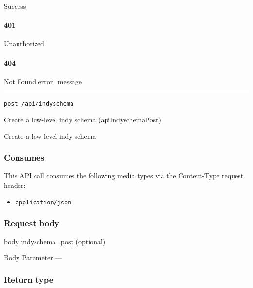 Success

\hypertarget{section-240}{%
\paragraph{401}\label{section-240}}

Unauthorized \protect\hyperlink{}{}

\hypertarget{section-241}{%
\paragraph{404}\label{section-241}}

Not Found \protect\hyperlink{error_message}{error\_message}

\begin{center}\rule{0.5\linewidth}{\linethickness}\end{center}

\protect\hypertarget{apiIndyschemaPost}{}{}

\begin{verbatim}
post /api/indyschema
\end{verbatim}

Create a low-level indy schema ({apiIndyschemaPost})

Create a low-level indy schema

\hypertarget{consumes-23}{%
\subsubsection{Consumes}\label{consumes-23}}

This API call consumes the following media types via the {Content-Type}
request header:

\begin{itemize}
\tightlist
\item
  \texttt{application/json}
\end{itemize}

\hypertarget{request-body-23}{%
\subsubsection{Request body}\label{request-body-23}}

body \protect\hyperlink{indyschema_post}{indyschema\_post} (optional)

{Body Parameter} ---

\hypertarget{return-type-59}{%
\subsubsection{Return type}\label{return-type-59}}

